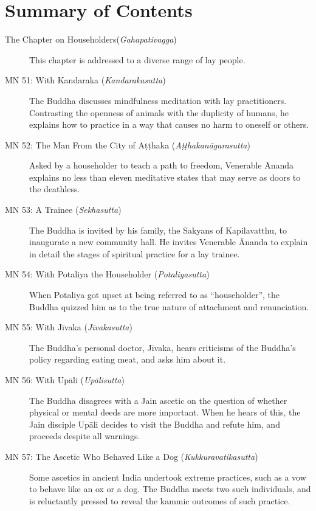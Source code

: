 \documentclass[12pt,openany]{book}%
\begin{document}
\newpage

\setlength{\parindent}{1.5em}%
\tableofcontents
\newpage
\pagestyle{fancy}
%
\chapter*{Summary of Contents}

\begin{description}%
\item[The Chapter on Householders(\textit{\textsanskrit{Gahapativagga}})] This chapter is addressed to a diverse range of lay people.%
\item[MN 51: With Kandaraka (\textit{\textsanskrit{Kandarakasutta}})] The Buddha discusses mindfulness meditation with lay practitioners. Contrasting the openness of animals with the duplicity of humans, he explains how to practice in a way that causes no harm to oneself or others.%
\item[MN 52: The Man From the City of \textsanskrit{Aṭṭhaka} (\textit{\textsanskrit{Aṭṭhakanāgarasutta}})] Asked by a householder to teach a path to freedom, Venerable Ānanda explains no less than eleven meditative states that may serve as doors to the deathless.%
\item[MN 53: A Trainee (\textit{\textsanskrit{Sekhasutta}})] The Buddha is invited by his family, the Sakyans of Kapilavatthu, to inaugurate a new community hall. He invites Venerable Ānanda to explain in detail the stages of spiritual practice for a lay trainee.%
\item[MN 54: With Potaliya the Householder (\textit{\textsanskrit{Potaliyasutta}})] When Potaliya got upset at being referred to as “householder”, the Buddha quizzed him as to the true nature of attachment and renunciation.%
\item[MN 55: With \textsanskrit{Jīvaka} (\textit{\textsanskrit{Jīvakasutta}})] The Buddha’s personal doctor, \textsanskrit{Jīvaka}, hears criticisms of the Buddha’s policy regarding eating meat, and asks him about it.%
\item[MN 56: With \textsanskrit{Upāli} (\textit{\textsanskrit{Upālisutta}})] The Buddha disagrees with a Jain ascetic on the question of whether physical or mental deeds are more important. When he hears of this, the Jain disciple \textsanskrit{Upāli} decides to visit the Buddha and refute him, and proceeds despite all warnings.%
\item[MN 57: The Ascetic Who Behaved Like a Dog (\textit{\textsanskrit{Kukkuravatikasutta}})] Some ascetics in ancient India undertook extreme practices, such as a vow to behave like an ox or a dog. The Buddha meets two such individuals, and is reluctantly pressed to reveal the kammic outcomes of such practice.%

\end{description}
\end{document}
